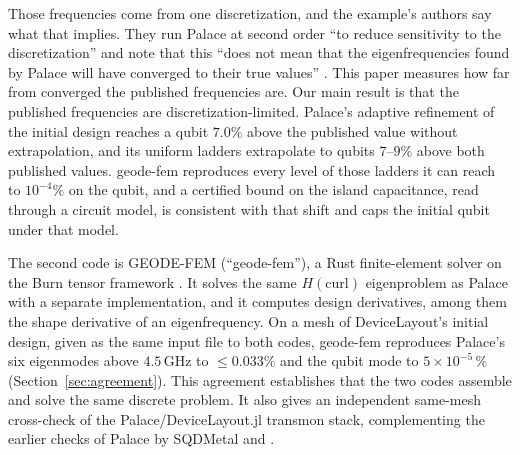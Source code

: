 \documentclass{anvil-paper}
\begin{document}
Those frequencies come from one discretization, and the example's authors
say what that implies. They run Palace at second order ``to reduce
sensitivity to the discretization'' and note that this ``does not mean that
the eigenfrequencies found by Palace will have converged to their true
values'' \citep{devicelayout-example}. This paper measures
how far from converged the published frequencies are. Our
main result is that the published frequencies are discretization-limited.
Palace's adaptive refinement of the initial design reaches a qubit $7.0\%$ above the
published value without extrapolation, and its uniform ladders extrapolate
to qubits $7$--$9\%$ above both published values. geode-fem reproduces every
level of those ladders it can reach to $10^{-4}\%$ on the qubit, and a
certified bound on the island capacitance, read through a circuit model, is
consistent with that shift and caps the initial qubit under that model.

The second code is GEODE-FEM (``geode-fem''), a Rust finite-element solver
on the Burn tensor framework \citep{burn}. It solves the same
$H(\mathrm{curl})$ eigenproblem as Palace with a separate implementation,
and it computes design derivatives, among them the shape derivative of an
eigenfrequency. On a mesh of DeviceLayout's initial design, given as the
same input file to both codes, geode-fem reproduces Palace's six eigenmodes above $4.5$\,GHz to
$\leq 0.033\%$ and the qubit mode to $5\times10^{-5}\,\%$
(Section~\ref{sec:agreement}). This agreement establishes that the two codes
assemble and solve the same discrete problem. It also gives an independent
same-mesh cross-check of the Palace/DeviceLayout.jl transmon stack,
complementing the earlier checks of Palace by SQDMetal
\citep{sommers2025open} and \citet{ye2025electromagnetic}.
\end{document}

